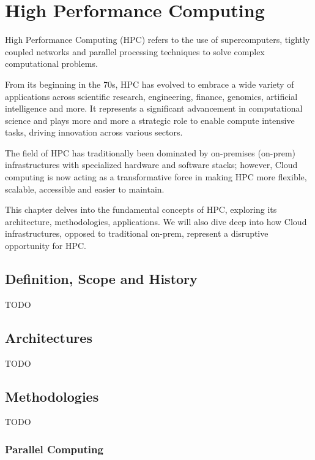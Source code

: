 

\chapter{High Performance Computing}

High Performance Computing (HPC) refers to the use of supercomputers, tightly coupled networks and parallel processing techniques to solve complex computational problems. 

From its beginning in the 70s, HPC has evolved to embrace a wide variety of applications across scientific research, engineering, finance, genomics, artificial intelligence and more. 
It represents a significant advancement in computational science and plays more and more a strategic role to enable compute intensive tasks, driving innovation across various sectors. 

The field of HPC has traditionally been dominated by on-premises (on-prem) infrastructures with specialized hardware and software stacks; however, Cloud computing is now acting as a transformative force in making HPC more flexible, scalable, accessible and easier to maintain.

This chapter delves into the fundamental concepts of HPC, exploring its architecture, methodologies, applications. We will also dive deep into how Cloud infrastructures, opposed to traditional on-prem, represent a disruptive opportunity for HPC.

\section{Definition, Scope and History}

TODO

\section{Architectures}

TODO

\section{Methodologies}

TODO

\subsection{Parallel Computing}

